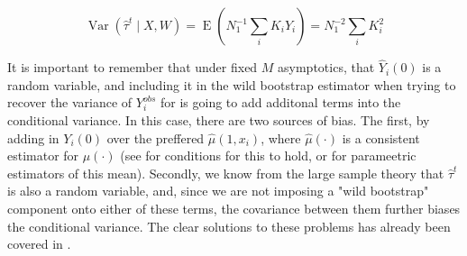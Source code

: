 \documentclass{article}
\DeclareMathOperator{\E}{E}
\DeclareMathOperator{\Var}{Var}
\newcommand{\hta}{\hat \tau^{t}}
\begin{document}
$$\Var(\hta \mid X,W) = \E(N_{1}^{-1}\sum_{i}K_{i}Y_{i}) = N_{1}^{-2}\sum_{i}K_{i}^{2}$$

It is important to remember that under fixed $M$ asymptotics, that $\hat Y_{i}(0)$ is a random variable, and including it in the wild bootstrap estimator when trying to recover the variance of $Y_{i}^{obs}$ for is going to add additonal terms into the conditional variance. In this case, there are two sources of bias. The first, by adding in $Y_{i}(0)$ over the preffered $\hat \mu(1,x_{i})$, where $\hat \mu(\cdot)$ is a consistent estimator for $\mu(\cdot)$ (see \cite{AnI:06} for conditions for this to hold, or \cite{InR:15} for parameetric estimators of this mean). Secondly, we know from the large sample theory that $\hat \tau^{t}$ is also a random variable, and, since we are not imposing a "wild bootstrap" component onto either of these terms, the covariance between them further biases the conditional variance. The clear solutions to these problems has already been covered in \cite{OnR:16}.



\printbibliography
\end{document}
